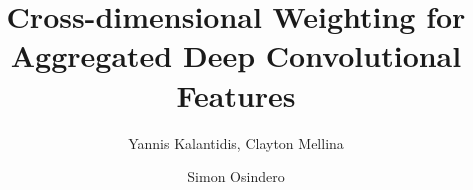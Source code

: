 \documentclass[runningheads]{llncs}
\begin{document}
\pagestyle{headings}
\mainmatter

\title{Cross-dimensional Weighting for \\ Aggregated Deep Convolutional Features}


\author{Yannis Kalantidis, Clayton Mellina \and Simon Osindero}


\maketitle


\newcommand{\nospace}{\vspace{-4mm}}
\newcommand{\head}[1]{{\smallskip\noindent\textbf{#1}}}
\newcommand{\alert}[1]{{\color{red}{#1}}}
\newcommand{\suppl}{\emph{given in the supplementary material}}



\newcommand{\one}{\mathbbm{1}}
\newcommand{\bbF}{\mathbb{F}}
\newcommand{\bbH}{\mathbb{H}}
\newcommand{\expect}{\mathbb{E}}
\newcommand{\project}{\mathbb{P}}
\newcommand{\real}{\mathbb{R}}
\newcommand{\tran}{^{\mathrm{T}}}
\newcommand{\diff}{\mathrm{d}}
\newcommand{\prob}{\mathrm{Pr}}
\newcommand{\binomial}{\mathrm{Bi}}
\newcommand{\weibull}{\mathrm{Wb}}
\newcommand{\normal}{\mathcal{N}}
\newcommand{\wishart}{\mathcal{W}}
\newcommand{\zcol}{\mathbf{0}}
\newcommand{\zrow}{\zcol\tran}
\newcommand{\otherwise}{\mathrm{otherwise}}

\newcommand{\cA}{\mathcal{A}}
\newcommand{\cB}{\mathcal{B}}
\newcommand{\cC}{\mathcal{C}}
\newcommand{\cD}{\mathcal{D}}
\newcommand{\cE}{\mathcal{E}}
\newcommand{\cF}{\mathcal{F}}
\newcommand{\cG}{\mathcal{G}}
\newcommand{\cH}{\mathcal{H}}
\newcommand{\cI}{\mathcal{I}}
\newcommand{\cJ}{\mathcal{J}}
\newcommand{\cK}{\mathcal{K}}
\newcommand{\cL}{\mathcal{L}}
\newcommand{\cM}{\mathcal{M}}
\newcommand{\cN}{\mathcal{N}}
\newcommand{\cO}{\mathcal{O}}
\newcommand{\cP}{\mathcal{P}}
\newcommand{\cQ}{\mathcal{Q}}
\newcommand{\cR}{\mathcal{R}}
\newcommand{\cS}{\mathcal{S}}
\newcommand{\cT}{\mathcal{T}}
\newcommand{\cU}{\mathcal{U}}
\newcommand{\cV}{\mathcal{V}}
\newcommand{\cW}{\mathcal{W}}
\newcommand{\cX}{\mathcal{X}}
\newcommand{\cY}{\mathcal{Y}}
\newcommand{\cZ}{\mathcal{Z}}

\newcommand{\cII}{\mathcal{I}_f}
\newcommand{\cAA}{\mathcal{A}_f}
\newcommand{\It}{i}
\newcommand{\At}{a}
\end{document}
